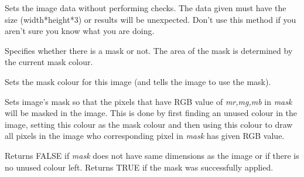 

\label{wximagesetdata}


Sets the image data without performing checks. The data given must have
the size (width*height*3) or results will be unexpected. Don't use this
method if you aren't sure you know what you are doing.

\label{wximagesetmask}


Specifies whether there is a mask or not. The area of the mask is determined by the current mask colour.

\label{wximagesetmaskcolour}


Sets the mask colour for this image (and tells the image to use the mask).

\label{wximagesetmaskfromimage}





Sets image's mask so that the pixels that have RGB value of {\it mr,mg,mb}
in {\it mask} will be masked in the image. This is done by first finding an
unused colour in the image, setting this colour as the mask colour and then
using this colour to draw all pixels in the image who corresponding pixel 
in {\it mask} has given RGB value.


Returns FALSE if {\it mask} does not have same dimensions as the image or if
there is no unused colour left. Returns TRUE if the mask was successfully 
applied.


